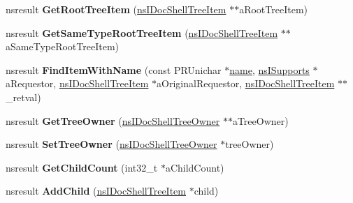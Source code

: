 \begin{DoxyCompactItemize}
\item 
\mbox{\label{interfacens_i_doc_shell_tree_item_ad2d709ca338b3f63f7a7f7bff12220ff}} 
nsresult {\bfseries Get\+Root\+Tree\+Item} (\hyperlink{interfacens_i_doc_shell_tree_item}{ns\+I\+Doc\+Shell\+Tree\+Item} $\ast$$\ast$a\+Root\+Tree\+Item)
\item 
\mbox{\label{interfacens_i_doc_shell_tree_item_a45ab5bba3812e0e61c0342dfbea6a838}} 
nsresult {\bfseries Get\+Same\+Type\+Root\+Tree\+Item} (\hyperlink{interfacens_i_doc_shell_tree_item}{ns\+I\+Doc\+Shell\+Tree\+Item} $\ast$$\ast$a\+Same\+Type\+Root\+Tree\+Item)
\item 
\mbox{\label{interfacens_i_doc_shell_tree_item_aa70476b0115f32e48f78674b9aaccabe}} 
nsresult {\bfseries Find\+Item\+With\+Name} (const P\+R\+Unichar $\ast$\hyperlink{structname}{name}, \hyperlink{interfacens_i_supports}{ns\+I\+Supports} $\ast$a\+Requestor, \hyperlink{interfacens_i_doc_shell_tree_item}{ns\+I\+Doc\+Shell\+Tree\+Item} $\ast$a\+Original\+Requestor, \hyperlink{interfacens_i_doc_shell_tree_item}{ns\+I\+Doc\+Shell\+Tree\+Item} $\ast$$\ast$\+\_\+retval)
\item 
\mbox{\label{interfacens_i_doc_shell_tree_item_aa29aaf01e383c28d3a07e3444770ce50}} 
nsresult {\bfseries Get\+Tree\+Owner} (\hyperlink{interfacens_i_supports}{ns\+I\+Doc\+Shell\+Tree\+Owner} $\ast$$\ast$a\+Tree\+Owner)
\item 
\mbox{\label{interfacens_i_doc_shell_tree_item_a1f9cf88732ab0c2d793b3e34d1294f96}} 
nsresult {\bfseries Set\+Tree\+Owner} (\hyperlink{interfacens_i_supports}{ns\+I\+Doc\+Shell\+Tree\+Owner} $\ast$tree\+Owner)
\item 
\mbox{\label{interfacens_i_doc_shell_tree_item_accca6e14c7a03968de58007872e3c059}} 
nsresult {\bfseries Get\+Child\+Count} (int32\+\_\+t $\ast$a\+Child\+Count)
\item 
\mbox{\label{interfacens_i_doc_shell_tree_item_a5de385d768d29e759cafb09064d6b12f}} 
nsresult {\bfseries Add\+Child} (\hyperlink{interfacens_i_doc_shell_tree_item}{ns\+I\+Doc\+Shell\+Tree\+Item} $\ast$child)

\end{DoxyCompactItemize}

